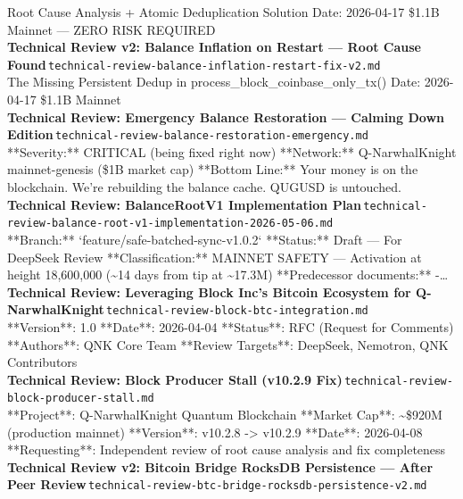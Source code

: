 \documentclass[11pt,a4paper]{article}
\begin{document}
Root Cause Analysis + Atomic Deduplication Solution Date: 2026-04-17 \textbar{} \$1.1B Mainnet --- ZERO RISK REQUIRED\\[6pt]
\noindent\textbf{Technical Review v2: Balance Inflation on Restart --- Root Cause Found}\,\textcolor{qgray}{\small \texttt{technical-review-balance-inflation-restart-fix-v2.md}}\\
The Missing Persistent Dedup in process\_block\_coinbase\_only\_tx() Date: 2026-04-17 \textbar{} \$1.1B Mainnet\\[6pt]
\noindent\textbf{Technical Review: Emergency Balance Restoration --- Calming Down Edition}\,\textcolor{qgray}{\small \texttt{technical-review-balance-restoration-emergency.md}}\\
**Severity:** CRITICAL (being fixed right now) **Network:** Q-NarwhalKnight mainnet-genesis (\$1B market cap) **Bottom Line:** Your money is on the blockchain. We're rebuilding the balance cache. QUGUSD is untouched.\\[6pt]
\noindent\textbf{Technical Review: BalanceRootV1 Implementation Plan}\,\textcolor{qgray}{\small \texttt{technical-review-balance-root-v1-implementation-2026-05-06.md}}\\
**Branch:** `feature/safe-batched-sync-v1.0.2` **Status:** Draft --- For DeepSeek Review **Classification:** MAINNET SAFETY --- Activation at height 18,600,000 (\textasciitilde{}14 days from tip at \textasciitilde{}17.3M) **Predecessor documents:** -\ldots{}\\[6pt]
\noindent\textbf{Technical Review: Leveraging Block Inc's Bitcoin Ecosystem for Q-NarwhalKnight}\,\textcolor{qgray}{\small \texttt{technical-review-block-btc-integration.md}}\\
**Version**: 1.0 \textbar{} **Date**: 2026-04-04 \textbar{} **Status**: RFC (Request for Comments) **Authors**: QNK Core Team \textbar{} **Review Targets**: DeepSeek, Nemotron, QNK Contributors\\[6pt]
\noindent\textbf{Technical Review: Block Producer Stall (v10.2.9 Fix)}\,\textcolor{qgray}{\small \texttt{technical-review-block-producer-stall.md}}\\
**Project**: Q-NarwhalKnight Quantum Blockchain **Market Cap**: \textasciitilde{}\$920M (production mainnet) **Version**: v10.2.8 -\textgreater{} v10.2.9 **Date**: 2026-04-08 **Requesting**: Independent review of root cause analysis and fix completeness\\[6pt]
\noindent\textbf{Technical Review v2: Bitcoin Bridge RocksDB Persistence --- After Peer Review}\,\textcolor{qgray}{\small \texttt{technical-review-btc-bridge-rocksdb-persistence-v2.md}}\\
\end{document}
